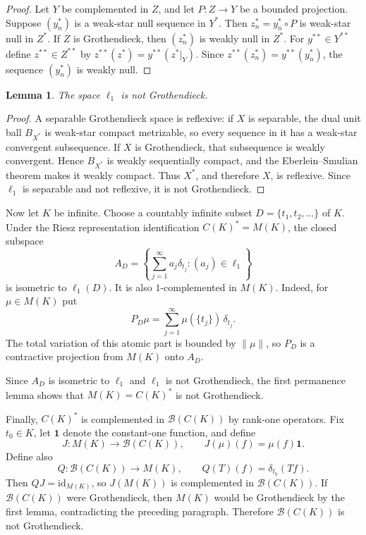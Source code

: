\documentclass[11pt]{article}
\newtheorem{lemma}{Lemma}
\newcommand{\B}{\mathscr{B}}
\begin{document}
\begin{proof}
Let $Y$ be complemented in $Z$, and let $P:Z\to Y$ be a bounded projection.
Suppose $(y_n^*)$ is a weak-star null sequence in $Y^*$. Then
$z_n^*=y_n^*\circ P$ is weak-star null in $Z^*$. If $Z$ is Grothendieck, then
$(z_n^*)$ is weakly null in $Z^*$. For $y^{**}\in Y^{**}$ define
$z^{**}\in Z^{**}$ by $z^{**}(z^*)=y^{**}(z^*|_Y)$. Since
$z^{**}(z_n^*)=y^{**}(y_n^*)$, the sequence $(y_n^*)$ is weakly null.
\end{proof}

\begin{lemma}
The space $\ell_1$ is not Grothendieck.
\end{lemma}

\begin{proof}
A separable Grothendieck space is reflexive: if $X$ is separable, the dual
unit ball $B_{X^*}$ is weak-star compact metrizable, so every sequence in it
has a weak-star convergent subsequence. If $X$ is Grothendieck, that
subsequence is weakly convergent. Hence $B_{X^*}$ is weakly sequentially
compact, and the Eberlein--Smulian theorem makes it weakly compact. Thus
$X^*$, and therefore $X$, is reflexive. Since $\ell_1$ is separable and not
reflexive, it is not Grothendieck.
\end{proof}

Now let $K$ be infinite. Choose a countably infinite subset
$D=\{t_1,t_2,\ldots\}$ of $K$. Under the Riesz representation identification
$C(K)^*=M(K)$, the closed subspace
\[
  A_D=\left\{\sum_{j=1}^\infty a_j\delta_{t_j} : (a_j)\in \ell_1\right\}
\]
is isometric to $\ell_1(D)$. It is also $1$-complemented in $M(K)$. Indeed,
for $\mu\in M(K)$ put
\[
  P_D\mu=\sum_{j=1}^\infty \mu(\{t_j\})\,\delta_{t_j}.
\]
The total variation of this atomic part is bounded by $\|\mu\|$, so
$P_D$ is a contractive projection from $M(K)$ onto $A_D$.

Since $A_D$ is isometric to $\ell_1$ and $\ell_1$ is not Grothendieck, the
first permanence lemma shows that $M(K)=C(K)^*$ is not Grothendieck.

Finally, $C(K)^*$ is complemented in $\B(C(K))$ by rank-one operators. Fix
$t_0\in K$, let $\mathbf{1}$ denote the constant-one function, and define
\[
  J:M(K)\to \B(C(K)),\qquad
  J(\mu)(f)=\mu(f)\mathbf{1}.
\]
Define also
\[
  Q:\B(C(K))\to M(K),\qquad
  Q(T)(f)=\delta_{t_0}(T f).
\]
Then $QJ=\mathrm{id}_{M(K)}$, so $J(M(K))$ is complemented in $\B(C(K))$.
If $\B(C(K))$ were Grothendieck, then $M(K)$ would be Grothendieck by the
first lemma, contradicting the preceding paragraph. Therefore $\B(C(K))$ is
not Grothendieck.
\end{document}
